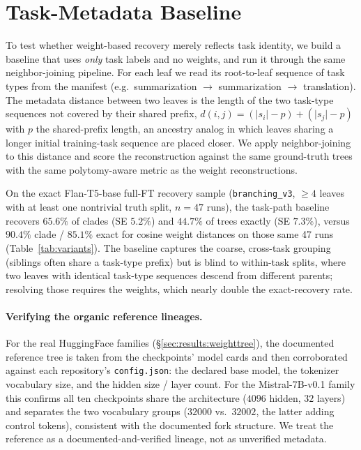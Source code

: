 \documentclass{article}
\theoremstyle{definition}
\theoremstyle{plain}
\begin{document}
\section{Task-Metadata Baseline}
\label{app:taskbaseline}

To test whether weight-based recovery merely reflects task identity, we build a baseline that uses
\emph{only} task labels and no weights, and run it through the same neighbor-joining pipeline. For each
leaf we read its root-to-leaf sequence of task types from the manifest (e.g.\ summarization $\to$
summarization $\to$ translation). The metadata distance between two leaves is the length of the two
task-type sequences not covered by their shared prefix, $d(i,j)=(\lvert s_i\rvert-p)+(\lvert
s_j\rvert-p)$ with $p$ the shared-prefix length, an ancestry analog in which leaves sharing a longer
initial training-task sequence are placed closer. We apply neighbor-joining to this distance and score
the reconstruction against the same ground-truth trees with the same polytomy-aware metric as the
weight reconstructions.

On the exact Flan-T5-base full-FT recovery sample (\texttt{branching\_v3}, $\geq 4$ leaves with at
least one nontrivial truth split, $n=47$ runs), the task-path baseline recovers $65.6\%$ of clades
(SE $5.2\%$) and $44.7\%$ of trees exactly (SE $7.3\%$), versus $90.4\%$ clade / $85.1\%$ exact for
cosine weight distances on those same 47 runs
(Table~\ref{tab:variants}). The baseline captures the coarse, cross-task grouping (siblings often
share a task-type prefix) but is blind to within-task splits, where two leaves with identical
task-type sequences descend from different parents; resolving those requires the weights, which nearly
double the exact-recovery rate.

\paragraph{Verifying the organic reference lineages.} For the real HuggingFace families
(\S\ref{sec:results:weighttree}), the documented reference tree is taken from the checkpoints' model cards and
then corroborated against each repository's \texttt{config.json}: the declared base model, the tokenizer
vocabulary size, and the hidden size / layer count. For the Mistral-7B-v0.1 family this confirms all ten
checkpoints share the architecture ($4096$ hidden, $32$ layers) and separates the two vocabulary groups
($32000$ vs.\ $32002$, the latter adding control tokens), consistent with the documented fork structure.
We treat the reference as a documented-and-verified lineage, not as unverified metadata.
\end{document}
